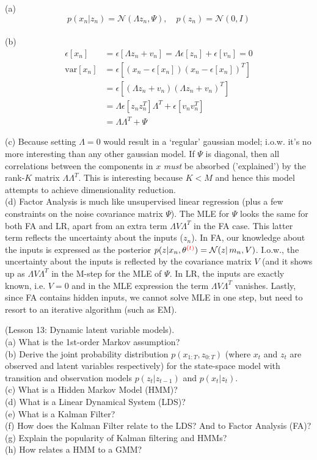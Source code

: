 \documentclass[a4paper]{article}
\newcommand{\N}{\mathcal{N}}
\newcommand{\mc}[1]{\mathcal{#1}}
\newcommand{\var}{\mathrm{var}}
\def\r#1{{\color{red}#1}}
\begin{document}
\begin{ExerciseList}
\Answer[ref={ex:6}]

(a) $$ p(x_n|z_n) = \mc{N}(\Lambda z_n,\Psi), \quad p(z_n)=\mc{N}(0,I)$$\\

(b) \begin{align*}
\epsilon[x_n] &= \epsilon[\Lambda z_n + v_n] = \Lambda \epsilon[z_n] + \epsilon[v_n] = 0\\
\var[x_n] &= \epsilon[(x_n-\epsilon[x_n])(x_n-\epsilon[x_n])^T]\\
    &=\epsilon[(\Lambda z_n + v_n)(\Lambda z_n + v_n)^T]\\
    &= \Lambda \epsilon[z_nz_n^T]\Lambda^T + \epsilon[v_nv_n^T]\\
    &=\Lambda\Lambda^T + \Psi
\end{align*}

(c) Because setting $\Lambda=0$ would result in a `regular' gaussian model; i.o.w. it's no more interesting than any other gaussian model. If $\Psi$ is diagonal, then all correlations between the components in $x$ \emph{must} be absorbed ('explained') by the rank-$K$ matrix $\Lambda \Lambda^T$. This is interesting because $K<M$ and hence this model attempts to achieve dimensionality reduction.\\

(d) Factor Analysis is much like unsupervised linear regression (plus a few constraints on the noise covariance matrix $\Psi$). The MLE for $\Psi$ looks the same for both FA and LR, apart from an extra term $\Lambda V \Lambda^T$ in the FA case. This latter term reflects the uncertainty about the inputs ($z_n$). In FA, our knowledge about the inputs is expressed as the posterior $p(z|x_n,\theta^{\r{(t)}}) = \N(z|\,m_n,V)$. I.o.w., the uncertainty about the inputs is reflected by the covariance matrix $V$ (and it shows up as $\Lambda V \Lambda^T$ in the M-step for the MLE of $\Psi$. In LR, the inputs are exactly known, i.e. $V=0$ and in the MLE expression the term $\Lambda V \Lambda^T$ vanishes. Lastly, since FA contains hidden inputs, we cannot solve MLE in one step, but need to resort to an iterative algorithm (such as EM).

\Exercise[label={ex:7}] (Lesson 13: Dynamic latent variable models). \\
(a) What is the 1st-order Markov assumption? \\
(b) Derive the joint probability distribution $p(x_{1:T},z_{0:T})$ (where $x_t$ and $z_t$ are observed and latent variables respectively) for the state-space model with transition and observation models $p(z_t|z_{t-1})$ and $p(x_t|z_t)$. \\
(c) What is a Hidden Markov Model (HMM)? \\
(d) What is a Linear Dynamical System (LDS)? \\
(e) What is a Kalman Filter? \\
(f) How does the Kalman Filter relate to the LDS? And to Factor Analysis (FA)? \\
(g) Explain the popularity of Kalman filtering and HMMs? \\
(h) How relates a HMM to a GMM? 


\end{ExerciseList}
\end{document}
